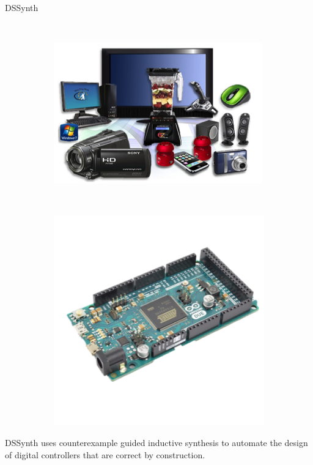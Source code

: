 \documentclass{beamer}
\newcommand\tool{{\sf DSSynth}\xspace}
\begin{document}
\begin{frame}{\tool}
\begin{figure}
\begin{subfigure}[b]{0.3\textwidth}
    \end{subfigure}
     ~
    \begin{subfigure}[b]{0.3\textwidth}
        \includegraphics[width=\textwidth]{figures/step1_figureD.png}
    \end{subfigure}
    ~
    \begin{subfigure}[b]{0.15\textwidth}
        \includegraphics[width=\textwidth]{figures/step1_figureA.png}
    \end{subfigure}
\end{figure}

\tool uses counter\-example guided inductive
synthesis to automate the design of digital controllers that are
correct by construction.
%
\end{frame}
\end{document}
